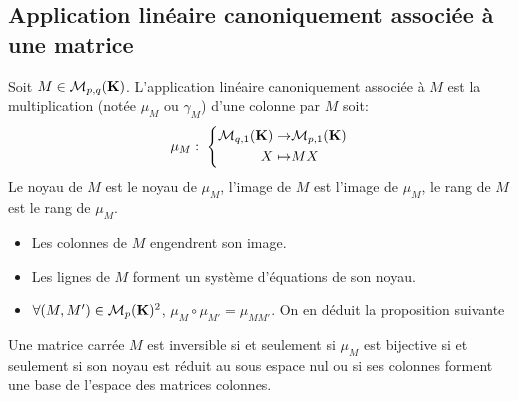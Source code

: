 \subsection{Application linéaire canoniquement associée à une matrice}
  
\begin{defi}
  Soit $M\in \mathcal{M}_{p,q}(\mathbf{K})$. L'application linéaire canoniquement associée à $M$ est la multiplication (notée $\mu_M$ ou $\gamma_M$) d'une colonne par $M$ soit:
\begin{displaymath}
\mu_M:\;  \left\lbrace 
  \begin{aligned}
    \mathcal{M}_{q,1}(\mathbf{K}) \rightarrow& \mathcal{M}_{p,1}(\mathbf{K}) \\
    X \mapsto& MX
  \end{aligned}
  \right. 
\end{displaymath}
Le noyau de $M$ est le noyau de $\mu_M$, l'image de $M$ est l'image de $\mu_M$, le rang de $M$ est le rang de $\mu_M$.
\end{defi}
\begin{rems}
  \begin{itemize}
    \item Les colonnes de $M$ engendrent son image.
    \item Les lignes de $M$ forment un système d'équations de son noyau.
    \item $\forall (M,M') \in \mathcal{M}_{p}(\mathbf{K})^2$, $\mu_M \circ \mu_{M'} = \mu_{MM'}$. On en déduit la proposition suivante 
  \end{itemize}
\end{rems}
\begin{propn}\label{carctinvers}
  Une matrice carrée $M$ est inversible si et seulement si $\mu_M$ est bijective si et seulement si son noyau est réduit au sous espace nul ou si ses colonnes forment une base de l'espace des matrices colonnes.
\end{propn}


